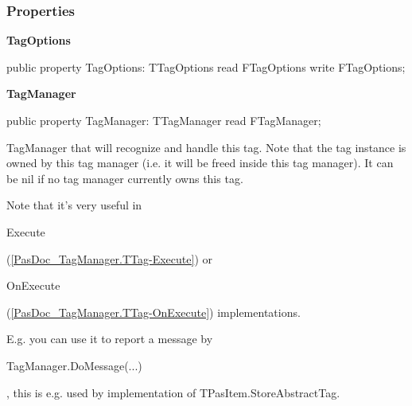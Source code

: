 \documentclass{report}
\newif\ifpdf
\begin{document}
\subsubsection*{\large{\textbf{Properties}}\normalsize\hspace{1ex}\hfill}
\begin{list}{}{
\setlength{\itemindent}{0cm}
\setlength{\listparindent}{0cm}
\setlength{\leftmargin}{\evensidemargin}
\addtolength{\leftmargin}{\tmplength}
\settowidth{\labelsep}{X}
\addtolength{\leftmargin}{\labelsep}
\setlength{\labelwidth}{\tmplength}
}
\label{PasDoc_TagManager.TTag-TagOptions}
\item[\textbf{TagOptions}\hfill]
\ifpdf
\begin{flushleft}
\fi
\begin{ttfamily}
public property TagOptions: TTagOptions read FTagOptions write FTagOptions;\end{ttfamily}

\ifpdf
\end{flushleft}
\fi


\par  \label{PasDoc_TagManager.TTag-TagManager}
\item[\textbf{TagManager}\hfill]
\ifpdf
\begin{flushleft}
\fi
\begin{ttfamily}
public property TagManager: TTagManager read FTagManager;\end{ttfamily}

\ifpdf
\end{flushleft}
\fi


\par TagManager that will recognize and handle this tag. Note that the tag instance is owned by this tag manager (i.e. it will be freed inside this tag manager). It can be nil if no tag manager currently owns this tag.

Note that it's very useful in \begin{ttfamily}Execute\end{ttfamily}(\ref{PasDoc_TagManager.TTag-Execute}) or \begin{ttfamily}OnExecute\end{ttfamily}(\ref{PasDoc_TagManager.TTag-OnExecute}) implementations.

E.g. you can use it to report a message by \begin{ttfamily}TagManager.DoMessage(...)\end{ttfamily}, this is e.g. used by implementation of TPasItem.StoreAbstractTag.


\end{list}
\end{document}
